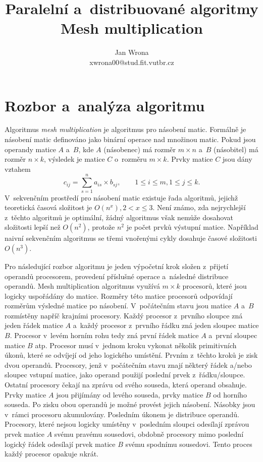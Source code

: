 \documentclass[a4paper, 12pt]{article}[24.4.2015]
\title{Paralelní a~distribuované algoritmy\\Mesh multiplication}
\author{Jan Wrona\\xwrona00@stud.fit.vutbr.cz}
\date{}
\begin{document}
\maketitle

\section{Rozbor a~analýza algoritmu} \label{analysis}
Algoritmus \emph{mesh multiplication} je algoritmus pro násobení matic. Formálně je násobení matic definováno jako binární operace nad množinou matic. Pokud jsou operandy matice \(A\) a~\(B\), kde \(A\) (násobenec) má rozměr \(m \times n\) a~\(B\) (násobitel) má rozměr \(n \times k\), výsledek je matice \(C\) o~rozměru \(m \times k\). Prvky matice \(C\) jsou dány vztahem
\begin{equation}\label{mat_mult}
c_{ij} = \sum_{s = 1}^{n} a_{is} \times b_{sj}, \qquad 1 \leq i \leq m, 1 \leq j \leq k.
\end{equation}
V~sekvenčním prostředí pro násobení matic existuje řada algoritmů, jejichž teoretická časová složitost je \(O(n^x), 2 < x \leq 3\). Není známo, zda nejrychlejší z~těchto algoritmů je optimální, žádný algoritmus však nemůže dosahovat složitosti lepší než \(O(n^2)\), protože \(n^2\) je počet prvků výstupní matice. Například naivní sekvenčním algoritmus se třemi vnořenými cykly dosahuje časové složitosti \(O(n^3)\).

Pro následující rozbor algoritmu je jeden výpočetní krok složen z~přijetí operandů procesorem, provedení příslušné operace a~následné distribuce operandů. Mesh multiplication algoritmus využívá \(m \times k\) procesorů, které jsou logicky uspořádány do matice. Rozměry této matice procesorů odpovídají rozměrům výsledné matice po násobení. V~počátečním stavu jsou matice \(A\) a~\(B\) rozmístěny napříč krajními procesory. Každý procesor z~prvního sloupce zná jeden řádek matice \(A\) a~každý procesor z~prvního řádku zná jeden sloupec matice \(B\). Procesor v~levém horním rohu tedy zná první řádek matice \(A\) a~první sloupec matice \(B\) atp. Procesor musí v~jednom kroku vykonat několik primitivních úkonů, které se odvíjejí od jeho logického umístění. Prvním z~těchto kroků je zisk dvou operandů. Procesory, jenž v~počátečním stavu znají některý řádek a/nebo sloupec vstupní matice, jako operand použijí poslední prvek z~řádku/sloupce. Ostatní procesory čekají na zprávu od svého souseda, která operand obsahuje. Prvky matice \(A\) jsou přijímány od levého souseda, prvky matice \(B\) od horního souseda. Po zisku obou operandů je možné provést jejich násobení. Násobky jsou v~rámci procesoru akumulovány. Posledním úkonem je distribuce operandů. Procesory, které nejsou logicky umístěny v~posledním sloupci odesílají zprávou prvek matice \(A\) svému pravému sousedovi, obdobně procesory mimo poslední logický řádek odesílají prvek matice \(B\) svému spodnímu sousedovi. Tento proces každý procesor opakuje \(n\)krát.
\end{document}
